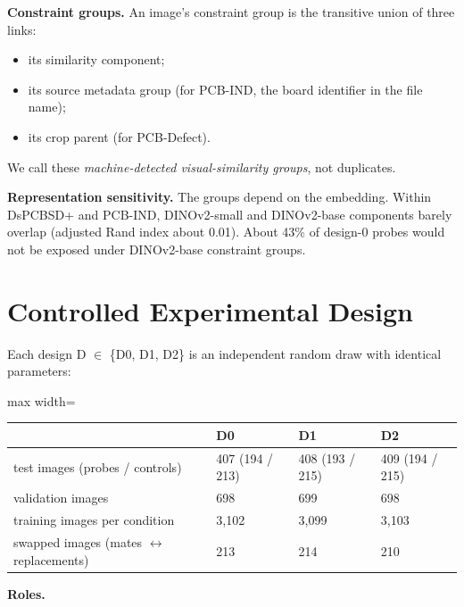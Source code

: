 \documentclass[11pt]{article}
\begin{document}
\textbf{Constraint groups.} An image's constraint group is the transitive union of three links:

\begin{itemize}
\item its similarity component;
\item its source metadata group (for PCB-IND, the board identifier in the file name);
\item its crop parent (for PCB-Defect).
\end{itemize}
We call these \emph{machine-detected visual-similarity groups}, not duplicates.

\textbf{Representation sensitivity.} The groups depend on the embedding. Within DsPCBSD+ and PCB-IND, DINOv2-small and DINOv2-base components barely overlap (adjusted Rand index about 0.01). About 43\% of design-0 probes would not be exposed under DINOv2-base constraint groups.

\section{Controlled Experimental Design}
Each design D $\in$ \{D0, D1, D2\} is an independent random draw with identical parameters:

\begin{table}[htbp]\centering\small
\begin{adjustbox}{max width=\linewidth}
\begin{tabular}{llll}
\toprule
 & D0 & D1 & D2 \\ \midrule
test images (probes / controls) & 407 (194 / 213) & 408 (193 / 215) & 409 (194 / 215) \\
validation images & 698 & 699 & 698 \\
training images per condition & 3,102 & 3,099 & 3,103 \\
swapped images (mates $\leftrightarrow$ replacements) & 213 & 214 & 210 \\
\bottomrule
\end{tabular}
\end{adjustbox}
\end{table}
\textbf{Roles.}
\end{document}
